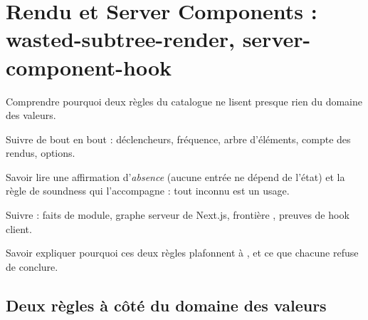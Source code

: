 
\chapter{Rendu et Server Components : wasted-subtree-render, server-component-hook}
\label{chap:regles-rendu-rsc}

\begin{objectifs}
  \item Comprendre pourquoi deux règles du catalogue ne lisent presque rien du domaine des valeurs.
  \item Suivre  de bout en bout : déclencheurs, fréquence, arbre d'éléments, compte des rendus, options.
  \item Savoir lire une affirmation d'\emph{absence} (\og aucune entrée ne dépend de l'état\fg{}) et la règle de soundness qui l'accompagne : tout inconnu est un usage.
  \item Suivre  : faits de module, graphe serveur de Next.js, frontière , preuves de hook client.
  \item Savoir expliquer pourquoi ces deux règles plafonnent à \Warning{}, et ce que chacune refuse de conclure.
\end{objectifs}


\section{Deux règles à côté du domaine des valeurs}
\label{sec:regles-rendu-rsc-apercu}

